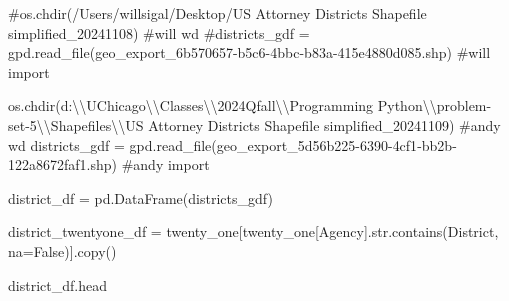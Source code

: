 \documentclass[
  letterpaper,
  DIV=11,
  numbers=noendperiod]{scrartcl}
\newenvironment{Shaded}{\begin{snugshade}}{\end{snugshade}}
\newcommand{\BuiltInTok}[1]{\textcolor[rgb]{0.00,0.23,0.31}{#1}}
\newcommand{\CharTok}[1]{\textcolor[rgb]{0.13,0.47,0.30}{#1}}
\newcommand{\CommentTok}[1]{\textcolor[rgb]{0.37,0.37,0.37}{#1}}
\newcommand{\NormalTok}[1]{\textcolor[rgb]{0.00,0.23,0.31}{#1}}
\newcommand{\OperatorTok}[1]{\textcolor[rgb]{0.37,0.37,0.37}{#1}}
\newcommand{\StringTok}[1]{\textcolor[rgb]{0.13,0.47,0.30}{#1}}
\newcommand{\VariableTok}[1]{\textcolor[rgb]{0.07,0.07,0.07}{#1}}
\begin{document}
\begin{Shaded}
\begin{Highlighting}[]
\CommentTok{\#os.chdir(\textquotesingle{}/Users/willsigal/Desktop/US Attorney Districts Shapefile simplified\_20241108\textquotesingle{}) \#will wd}
\CommentTok{\#districts\_gdf = gpd.read\_file(\textquotesingle{}geo\_export\_6b570657{-}b5c6{-}4bbc{-}b83a{-}415e4880d085.shp\textquotesingle{}) \#will import}

\NormalTok{os.chdir(}\StringTok{\textquotesingle{}d:}\CharTok{\textbackslash{}\textbackslash{}}\StringTok{UChicago}\CharTok{\textbackslash{}\textbackslash{}}\StringTok{Classes}\CharTok{\textbackslash{}\textbackslash{}}\StringTok{2024Qfall}\CharTok{\textbackslash{}\textbackslash{}}\StringTok{Programming Python}\CharTok{\textbackslash{}\textbackslash{}}\StringTok{problem{-}set{-}5}\CharTok{\textbackslash{}\textbackslash{}}\StringTok{Shapefiles}\CharTok{\textbackslash{}\textbackslash{}}\StringTok{US Attorney Districts Shapefile simplified\_20241109\textquotesingle{}}\NormalTok{) }\CommentTok{\#andy wd}
\NormalTok{districts\_gdf }\OperatorTok{=}\NormalTok{ gpd.read\_file(}\StringTok{\textquotesingle{}geo\_export\_5d56b225{-}6390{-}4cf1{-}bb2b{-}122a8672faf1.shp\textquotesingle{}}\NormalTok{) }\CommentTok{\#andy import}

\NormalTok{district\_df }\OperatorTok{=}\NormalTok{ pd.DataFrame(districts\_gdf)}
\end{Highlighting}
\end{Shaded}

\begin{Shaded}
\begin{Highlighting}[]
\NormalTok{district\_twentyone\_df }\OperatorTok{=}\NormalTok{ twenty\_one[twenty\_one[}\StringTok{\textquotesingle{}Agency\textquotesingle{}}\NormalTok{].}\BuiltInTok{str}\NormalTok{.contains(}\StringTok{\textquotesingle{}District\textquotesingle{}}\NormalTok{, na}\OperatorTok{=}\VariableTok{False}\NormalTok{)].copy()}
\end{Highlighting}
\end{Shaded}

\begin{Shaded}
\begin{Highlighting}[]
\NormalTok{district\_df.head}
\end{Highlighting}
\end{Shaded}
\end{document}
